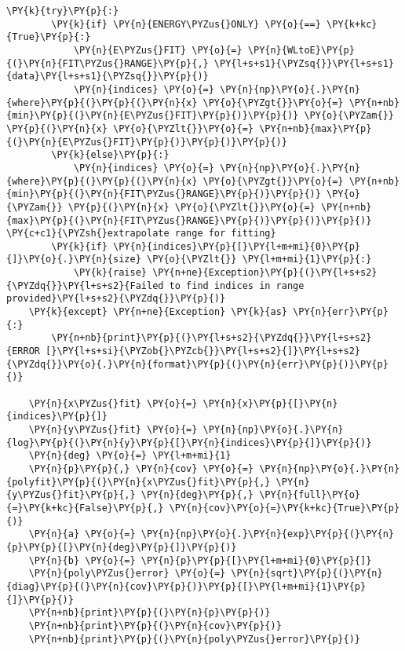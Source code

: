 \begin{tcolorbox}[breakable, size=fbox, boxrule=1pt, pad at break*=1mm,colback=cellbackground, colframe=cellborder]
\begin{Verbatim}[commandchars=\\\{\}]
    \PY{k}{try}\PY{p}{:}
        \PY{k}{if} \PY{n}{ENERGY\PYZus{}ONLY} \PY{o}{==} \PY{k+kc}{True}\PY{p}{:}
            \PY{n}{E\PYZus{}FIT} \PY{o}{=} \PY{n}{WLtoE}\PY{p}{(}\PY{n}{FIT\PYZus{}RANGE}\PY{p}{,} \PY{l+s+s1}{\PYZsq{}}\PY{l+s+s1}{data}\PY{l+s+s1}{\PYZsq{}}\PY{p}{)}
            \PY{n}{indices} \PY{o}{=} \PY{n}{np}\PY{o}{.}\PY{n}{where}\PY{p}{(}\PY{p}{(}\PY{n}{x} \PY{o}{\PYZgt{}}\PY{o}{=} \PY{n+nb}{min}\PY{p}{(}\PY{n}{E\PYZus{}FIT}\PY{p}{)}\PY{p}{)} \PY{o}{\PYZam{}} \PY{p}{(}\PY{n}{x} \PY{o}{\PYZlt{}}\PY{o}{=} \PY{n+nb}{max}\PY{p}{(}\PY{n}{E\PYZus{}FIT}\PY{p}{)}\PY{p}{)}\PY{p}{)}
        \PY{k}{else}\PY{p}{:}
            \PY{n}{indices} \PY{o}{=} \PY{n}{np}\PY{o}{.}\PY{n}{where}\PY{p}{(}\PY{p}{(}\PY{n}{x} \PY{o}{\PYZgt{}}\PY{o}{=} \PY{n+nb}{min}\PY{p}{(}\PY{n}{FIT\PYZus{}RANGE}\PY{p}{)}\PY{p}{)} \PY{o}{\PYZam{}} \PY{p}{(}\PY{n}{x} \PY{o}{\PYZlt{}}\PY{o}{=} \PY{n+nb}{max}\PY{p}{(}\PY{n}{FIT\PYZus{}RANGE}\PY{p}{)}\PY{p}{)}\PY{p}{)} \PY{c+c1}{\PYZsh{}extrapolate range for fitting}
        \PY{k}{if} \PY{n}{indices}\PY{p}{[}\PY{l+m+mi}{0}\PY{p}{]}\PY{o}{.}\PY{n}{size} \PY{o}{\PYZlt{}} \PY{l+m+mi}{1}\PY{p}{:}
            \PY{k}{raise} \PY{n+ne}{Exception}\PY{p}{(}\PY{l+s+s2}{\PYZdq{}}\PY{l+s+s2}{Failed to find indices in range provided}\PY{l+s+s2}{\PYZdq{}}\PY{p}{)}
    \PY{k}{except} \PY{n+ne}{Exception} \PY{k}{as} \PY{n}{err}\PY{p}{:}
        \PY{n+nb}{print}\PY{p}{(}\PY{l+s+s2}{\PYZdq{}}\PY{l+s+s2}{ERROR [}\PY{l+s+si}{\PYZob{}\PYZcb{}}\PY{l+s+s2}{]}\PY{l+s+s2}{\PYZdq{}}\PY{o}{.}\PY{n}{format}\PY{p}{(}\PY{n}{err}\PY{p}{)}\PY{p}{)}
    
    \PY{n}{x\PYZus{}fit} \PY{o}{=} \PY{n}{x}\PY{p}{[}\PY{n}{indices}\PY{p}{]}
    \PY{n}{y\PYZus{}fit} \PY{o}{=} \PY{n}{np}\PY{o}{.}\PY{n}{log}\PY{p}{(}\PY{n}{y}\PY{p}{[}\PY{n}{indices}\PY{p}{]}\PY{p}{)}
    \PY{n}{deg} \PY{o}{=} \PY{l+m+mi}{1}    
    \PY{n}{p}\PY{p}{,} \PY{n}{cov} \PY{o}{=} \PY{n}{np}\PY{o}{.}\PY{n}{polyfit}\PY{p}{(}\PY{n}{x\PYZus{}fit}\PY{p}{,} \PY{n}{y\PYZus{}fit}\PY{p}{,} \PY{n}{deg}\PY{p}{,} \PY{n}{full}\PY{o}{=}\PY{k+kc}{False}\PY{p}{,} \PY{n}{cov}\PY{o}{=}\PY{k+kc}{True}\PY{p}{)}    
    \PY{n}{a} \PY{o}{=} \PY{n}{np}\PY{o}{.}\PY{n}{exp}\PY{p}{(}\PY{n}{p}\PY{p}{[}\PY{n}{deg}\PY{p}{]}\PY{p}{)}  
    \PY{n}{b} \PY{o}{=} \PY{n}{p}\PY{p}{[}\PY{l+m+mi}{0}\PY{p}{]}
    \PY{n}{poly\PYZus{}error} \PY{o}{=} \PY{n}{sqrt}\PY{p}{(}\PY{n}{diag}\PY{p}{(}\PY{n}{cov}\PY{p}{)}\PY{p}{[}\PY{l+m+mi}{1}\PY{p}{]}\PY{p}{)}
    \PY{n+nb}{print}\PY{p}{(}\PY{n}{p}\PY{p}{)}
    \PY{n+nb}{print}\PY{p}{(}\PY{n}{cov}\PY{p}{)}
    \PY{n+nb}{print}\PY{p}{(}\PY{n}{poly\PYZus{}error}\PY{p}{)}
    

\end{Verbatim}
\end{tcolorbox}
